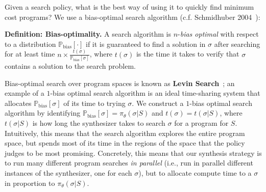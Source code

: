 \documentclass{article}
\newcommand{\probability}{\mathds{P}} %
\theoremstyle{definition}
\begin{document}
Given a search policy, what is the best way of using it to quickly find minimum cost programs?
We use a bias-optimal search algorithm (c.f. Schmidhuber 2004~\citep{schmidhuber2004optimal}):

\noindent\textbf{Definition: Bias-optimality.} 
   A search algorithm is $n$-\emph{bias optimal}
with respect to a distribution $\probability_{\text{bias}}[\cdot ]$ if it is
guaranteed to find a solution in $\sigma $ after searching for at least time
$n\times\frac{t(\sigma )}{\probability_{\text{bias}}[\sigma ]}$, where $t(\sigma )$ is the time it
takes to verify that $\sigma $ contains a solution to the
search problem.




Bias-optimal search over program spaces is known as \textbf{Levin
  Search}~\cite{levin1973universal}; an example of a $1$-bias optimal
search algorithm is an ideal time-sharing system that allocates
$\probability_{\text{bias}}[\sigma ]$ of its time to trying $\sigma $.
We construct a $1$-bias optimal search algorithm by identifying
$\probability_{\text{bias}}[\sigma ] = \pi_\theta(\sigma |S)$ and
$t(\sigma ) = t(\sigma|S)$, where $t(\sigma|S)$ is how long the
synthesizer takes to search $\sigma $ for a program for
$S$. Intuitively, this means that the search algorithm explores the
entire program space, but spends most of its time in the regions of
the space that the policy judges to be most promising.  Concretely,
this means that our synthesis strategy is to run many different
program searches \emph{in parallel} (i.e., run in parallel different
instances of the synthesizer, one for each $\sigma$), but to
allocate compute time to a $\sigma $ in proportion to
$\pi_\theta(\sigma |S)$.

    
\end{document}
